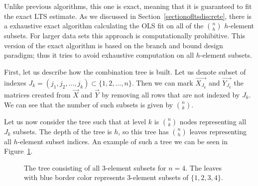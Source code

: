 Unlike previous algorithms, this one is exact, meaning that it is guaranteed to fit the exact LTS estimate. As we discussed in Section~\ref{sectionofltsdiscrete}, there is a exhaustive exact algorithm calculating the OLS fit on all of the $\binom{n}{h}$ $h$-element subsets. For larger data sets this approach is computationally prohibitive. This version of the exact algorithm is based on the branch and bound design paradigm; thus it tries to avoid exhaustive computation on all $h$-element subsets. 

First, let us describe how the combination tree is built. 
Let us denote subset of indexes 
$J_k = (j_1, j_2, \ldots , j_k) \subset \{{1,2,\ldots , n\}}$. Then we can mark
$\vec{ X_{J_k} }$ and $\vec{ Y_{J_k} }$ the matrices created from $\vec{X}$
and $\vec{Y}$ by removing all rows that are not indexed by $J_k$.
We can see that the number of such subsets is given by $\binom{n}{k}$.

Let us now consider the tree such that at level $k$ is $\binom{n}{k}$ nodes representing all $J_k$ subsets. The depth of the tree is $h$, so this tree has $\binom{n}{h}$ leaves representing all $h$-element subset indices. An example of such a tree we can be seen in Figure~\ref{figure:full:tree}.

\begin{figure}[h]
\centering

\begin{center}
\end{center}


\caption{The tree consisting of all $3$-element subsets for $n=4$. The leaves with blue border color represents $3$-element subsets of $\{{1,2,3,4\}}$.}
\label{figure:full:tree}
\end{figure}


